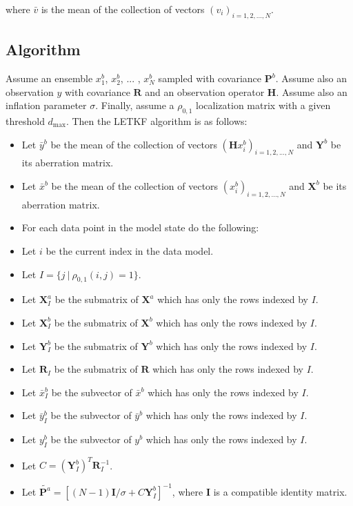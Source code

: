 \documentclass{article}
\begin{document}
where $\bar{v}$ is the mean of the collection of vectors $( v_i )_{i = 1, 2, ... , N}$.

\subsection{Algorithm}

Assume an ensemble $x_1^b$, $x_2^b$, ... , $x_N^b$ sampled with covariance $\mathbf{P}^b$. Assume also an observation $y$ with covariance $\mathbf{R}$ and an observation operator $\mathbf{H}$. Assume also an inflation parameter $\sigma$. Finally, assume a $\rho_{0, 1}$ localization matrix with a given threshold $d_\text{max}$. Then the LETKF algorithm is as follows:

\begin{itemize}
\item Let $\bar{y}^b$ be the mean of the collection of vectors $(\mathbf{H} x_i^b)_{i = 1, 2, ... , N}$ and $\mathbf{Y}^b$ be its aberration matrix.
\item Let $\bar{x}^b$ be the mean of the collection of vectors $(x_i^b)_{i = 1, 2, ... , N}$ and $\mathbf{X}^b$ be its aberration matrix.
\item For each data point in the model state do the following:
\item Let $i$ be the current index in the data model.
\item Let $I = \{ j \: | \: \rho_{0, 1} (i, j) = 1 \}$.
\item Let $\mathbf{X}_I^a$ be the submatrix of $\mathbf{X}^a$ which has only the rows indexed by $I$.
\item Let $\mathbf{X}_I^b$ be the submatrix of $\mathbf{X}^b$ which has only the rows indexed by $I$.
\item Let $\mathbf{Y}_I^b$ be the submatrix of $\mathbf{Y}^b$ which has only the rows indexed by $I$.
\item Let $\mathbf{R}_I$ be the submatrix of $\mathbf{R}$ which has only the rows indexed by $I$.
\item Let $\bar{x}_I^b$ be the subvector of $\bar{x}^b$ which has only the rows indexed by $I$.
\item Let $\bar{y}_I^b$ be the subvector of $\bar{y}^b$ which has only the rows indexed by $I$.
\item Let $y_I^b$ be the subvector of $y^b$ which has only the rows indexed by $I$.
\item Let $C = (\mathbf{Y}_I^b)^T \mathbf{R}_I^{-1}$.
\item Let $\tilde{\mathbf{P}^a} = [(N - 1) \mathbf{I} / \sigma + C \mathbf{Y}_I^b]^{-1}$, where $\mathbf{I}$ is a compatible identity matrix.

\end{itemize}
\end{document}

